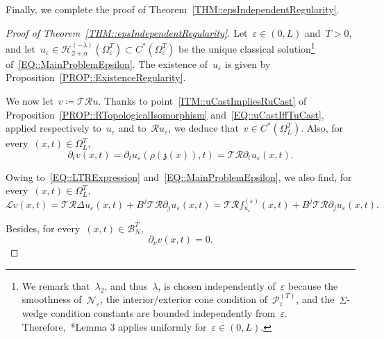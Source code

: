 \documentclass[12pt,a4paper]{amsart}
\numberwithin{equation}{section}
\theoremstyle{definition}
\theoremstyle{remark}
\newcommand{\eps}{\varepsilon}
\begin{document}
Finally, we complete the proof of Theorem~\ref{THM::epsIndependentRegularity}.

\begin{proof}[Proof of Theorem~\ref{THM::epsIndependentRegularity}]
    Let~$\eps \in (0,L)$ and~$T > 0$, and let~$u_\eps \in \mathcal{H}_{2+\alpha}^{(-\lambda)}(\Omega_\eps^T) \subset C^\ast\left(\Omega_\eps^T\right)$ be the unique classical solution\footnote{We remark that~$\lambda_2$, and thus~$\lambda$, is chosen independently of~$\eps$ because the smoothness of~$\mathcal{N}_\eps$, the interior/exterior cone condition of~$\mathcal{P}_\eps^{(T)}$, and the~$\Sigma$-wedge condition constants are bounded independently from~$\eps$. Therefore,~\cite{MR826642}*{Lemma 3} applies uniformly for~$\eps \in (0,L)$.} of~\eqref{EQ::MainProblemEpsilon}. The existence of~$u_\eps$ is given by Proposition~\ref{PROP::ExistenceRegularity}.

    We now let~$v \coloneq \mathcal{T}\mathcal{R}u$. Thanks to point~\ref{ITM::uCastImpliesRuCast} of Proposition~\ref{PROP::RTopologicalIsomorphism} and~\eqref{EQ::uCastIffTuCast}, applied respectively to~$u_\eps$ and to~$\mathcal{R}u_\eps$, we deduce that~$v \in C^\ast(\Omega_L^T)$. Also, for every~$(x,t)\in \Omega_L^T$,
    \begin{equation}\label{EQ::dTExtendedSolution}
        \partial_t v(x,t) = \partial_t u_\eps(\rho(\mathfrak{z}(x)),t) = \mathcal{T}\mathcal{R}\partial_t u_\eps(x,t).
    \end{equation}

    Owing to~\eqref{EQ::LTRExpression} and~\eqref{EQ::MainProblemEpsilon}, we also find, for every~$(x,t)\in \Omega_L^T$,
    \begin{equation}\label{EQ::LExtendedSolution}
        \mathcal{L}v(x,t) = \mathcal{T}\mathcal{R}\Delta u_\eps(x,t)+B^j\mathcal{T}\mathcal{R}\partial_j u_\eps(x,t) = \mathcal{T}\mathcal{R}f_{u_\eps}^{(\eps)}(x,t) + B^j\mathcal{T}\mathcal{R}\partial_j u_\eps(x,t).
    \end{equation}

    Besides, for every~$(x,t)\in \mathcal{B}_N^T$,
    \begin{equation}\label{EQ::dNuExtendedSolution}
        \partial_\nu v(x,t) = 0.
    \end{equation}


\end{proof}
\end{document}
